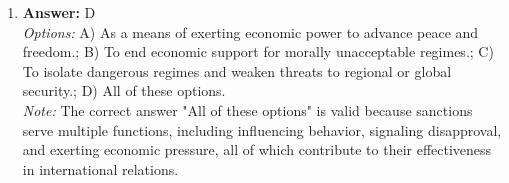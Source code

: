 \documentclass[12pt]{article}
\begin{document}
\begin{enumerate}[label=\arabic*.]
\\ \textit{Note:} Direct diplomacy refers to the practice where members of Congress engage in direct negotiations with foreign governments, thereby bypassing traditional diplomatic channels typically reserved for the executive branch, highlighting the legislative branch's role in foreign policy.
\item \textbf{Answer:} D
\\ \textit{Options:} A) As a means of exerting economic power to advance peace and freedom.; B) To end economic support for morally unacceptable regimes.; C) To isolate dangerous regimes and weaken threats to regional or global security.; D) All of these options.
\\ \textit{Note:} The correct answer "All of these options" is valid because sanctions serve multiple functions, including influencing behavior, signaling disapproval, and exerting economic pressure, all of which contribute to their effectiveness in international relations.
\end{enumerate}
\end{document}
